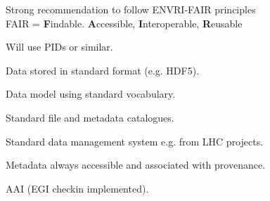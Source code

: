 \begin{frame}[fragile,t]
  \vspace{\mytopbit}
  {Strong recommendation to follow ENVRI-FAIR principles \\ }
FAIR = {\bf F}indable. {\bf A}ccessible, {\bf I}nteroperable, {\bf R}eusable
\bitm
\item Will use PIDs or similar.
\item Data stored in standard format (e.g. HDF5).
\item Data model using standard vocabulary.
\item Standard file and metadata catalogues.
\item Standard data management system e.g. from LHC projects.
\item Metadata always accessible and associated with provenance.
\item AAI (EGI checkin implemented).
\eitm
\end{frame}

